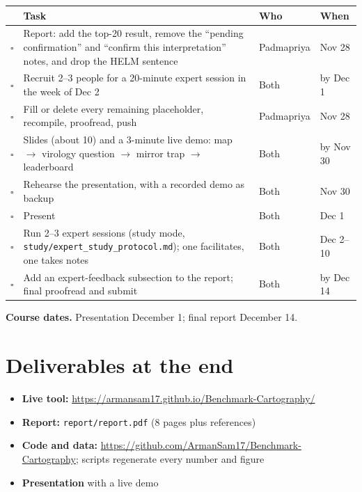 \documentclass[11pt]{article}
\newcommand{\todo}{\textcolor{todoc}{$\square$}}
\begin{document}
\begin{center}\small
\begin{tabularx}{\linewidth}{@{}p{0.4cm}Yp{2.4cm}p{2.3cm}@{}}
\toprule
& \textbf{Task} & \textbf{Who} & \textbf{When} \\
\midrule
\todo & Report: add the top-20 result, remove the ``pending confirmation'' and ``confirm this
interpretation'' notes, and drop the HELM sentence & Padmapriya & Nov 28 \\
\todo & Recruit 2--3 people for a 20-minute expert session in the week of Dec 2 & Both & by Dec 1 \\
\todo & Fill or delete every remaining placeholder, recompile, proofread, push & Padmapriya & Nov 28 \\
\todo & Slides (about 10) and a 3-minute live demo: map $\rightarrow$ virology question
$\rightarrow$ mirror trap $\rightarrow$ leaderboard & Both & by Nov 30 \\
\todo & Rehearse the presentation, with a recorded demo as backup & Both & Nov 30 \\
\todo & Present & Both & Dec 1 \\
\todo & Run 2--3 expert sessions (study mode, \texttt{study/expert\_study\_protocol.md}); one
facilitates, one takes notes & Both & Dec 2--10 \\
\todo & Add an expert-feedback subsection to the report; final proofread and submit & Both & by Dec 14 \\
\bottomrule
\end{tabularx}
\end{center}

\textbf{Course dates.} Presentation December 1; final report December 14.

\section{Deliverables at the end}
\begin{itemize}
  \item \textbf{Live tool:} \url{https://armansam17.github.io/Benchmark-Cartography/}
  \item \textbf{Report:} \texttt{report/report.pdf} (8 pages plus references)
  \item \textbf{Code and data:} \url{https://github.com/ArmanSam17/Benchmark-Cartography}; scripts
    regenerate every number and figure
  \item \textbf{Presentation} with a live demo
\end{itemize}
\end{document}

